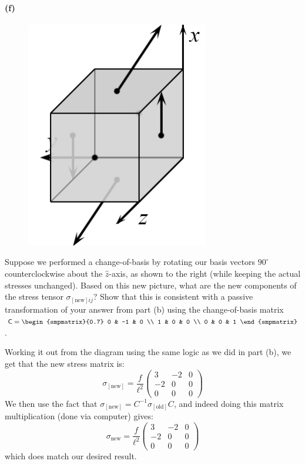 \documentclass{article}
\begin{document}
\paragraph{(f)}
	\setlength{\intextsep}{0pt}%
	\begin{figure}
		\includegraphics[scale=0.5]{89-PS7-P3-RotatedAxis}
	\end{figure}
Suppose we performed a change-of-basis by rotating our basis vectors $90^{\circ}$ counterclockwise about the $\hat{z}$-axis, as shown to the right (while keeping the
actual stresses unchanged).
Based on this new picture, what are the new components of the stress tensor $\sigma_{[\textrm{new}]ij}$?  
Show that this is consistent with a passive transformation  of your answer from part (b) using the change-of-basis matrix 
$\mathsf{C} = \begin{smpmatrix}{0.7} 0 & -1 & 0 \\ 1 & 0 & 0 \\ 0 & 0 & 1 \end{smpmatrix}$.

\bigskip
\begin{solution}
	Working it out from the diagram using the same logic as we did in part (b), we get that the new stress 
	matrix is:
	\[
		\sigma_{[\text{new}]} = \frac{f}{\ell^2}\begin{pmatrix} 3 & -2 & 0 \\ -2 & 0 & 0 \\0&0&0 \end{pmatrix} 
	\] 
	We then use the fact that $\sigma_{[\text{new}]} = C^{-1} \sigma_{[\text{old}]} C$, and indeed doing this 
	matrix multiplication (done via computer) gives:
	\[
		\sigma_{\text{new}} = \frac{f}{\ell^2}\begin{pmatrix} 3 & -2 & 0\\ -2 & 0 & 0 \\ 0 & 0 &0 \end{pmatrix} 
	\] 
	which does match our desired result. 
\end{solution}
\bigskip
\dphline
\pagebreak
\end{document}
